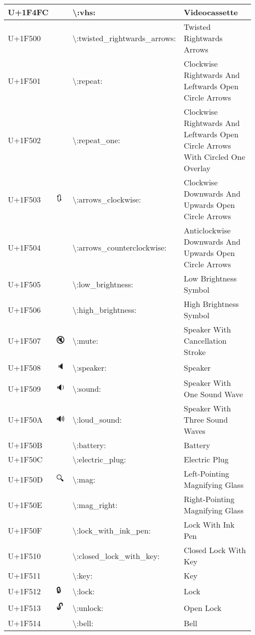 \begin{table}[h]
\begin{tabulary}{\linewidth}{|L|L|L|L|}
\hline
U+1F4FC & 📼 & {\textbackslash}:vhs: & Videocassette \\
\hline
U+1F500 & 🔀 & {\textbackslash}:twisted\_rightwards\_arrows: & Twisted Rightwards Arrows \\
\hline
U+1F501 & 🔁 & {\textbackslash}:repeat: & Clockwise Rightwards And Leftwards Open Circle Arrows \\
\hline
U+1F502 & 🔂 & {\textbackslash}:repeat\_one: & Clockwise Rightwards And Leftwards Open Circle Arrows With Circled One Overlay \\
\hline
U+1F503 & 🔃 & {\textbackslash}:arrows\_clockwise: & Clockwise Downwards And Upwards Open Circle Arrows \\
\hline
U+1F504 & 🔄 & {\textbackslash}:arrows\_counterclockwise: & Anticlockwise Downwards And Upwards Open Circle Arrows \\
\hline
U+1F505 & 🔅 & {\textbackslash}:low\_brightness: & Low Brightness Symbol \\
\hline
U+1F506 & 🔆 & {\textbackslash}:high\_brightness: & High Brightness Symbol \\
\hline
U+1F507 & 🔇 & {\textbackslash}:mute: & Speaker With Cancellation Stroke \\
\hline
U+1F508 & 🔈 & {\textbackslash}:speaker: & Speaker \\
\hline
U+1F509 & 🔉 & {\textbackslash}:sound: & Speaker With One Sound Wave \\
\hline
U+1F50A & 🔊 & {\textbackslash}:loud\_sound: & Speaker With Three Sound Waves \\
\hline
U+1F50B & 🔋 & {\textbackslash}:battery: & Battery \\
\hline
U+1F50C & 🔌 & {\textbackslash}:electric\_plug: & Electric Plug \\
\hline
U+1F50D & 🔍 & {\textbackslash}:mag: & Left-Pointing Magnifying Glass \\
\hline
U+1F50E & 🔎 & {\textbackslash}:mag\_right: & Right-Pointing Magnifying Glass \\
\hline
U+1F50F & 🔏 & {\textbackslash}:lock\_with\_ink\_pen: & Lock With Ink Pen \\
\hline
U+1F510 & 🔐 & {\textbackslash}:closed\_lock\_with\_key: & Closed Lock With Key \\
\hline
U+1F511 & 🔑 & {\textbackslash}:key: & Key \\
\hline
U+1F512 & 🔒 & {\textbackslash}:lock: & Lock \\
\hline
U+1F513 & 🔓 & {\textbackslash}:unlock: & Open Lock \\
\hline
U+1F514 & 🔔 & {\textbackslash}:bell: & Bell \\

\end{tabulary}
\end{table}
